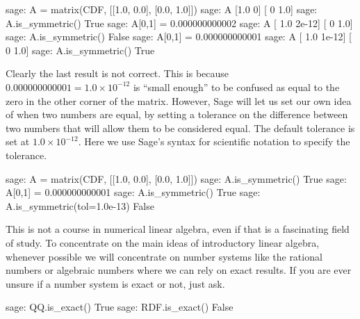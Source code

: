 %
\begin{sageexample}
sage: A = matrix(CDF, [[1.0, 0.0], [0.0, 1.0]])
sage: A
[1.0   0]
[  0 1.0]
sage: A.is_symmetric()
True
sage: A[0,1] = 0.000000000002
sage: A
[  1.0 2e-12]
[    0   1.0]
sage: A.is_symmetric()
False
sage: A[0,1] = 0.000000000001
sage: A
[  1.0 1e-12]
[    0   1.0]
sage: A.is_symmetric()
True
\end{sageexample}
%
Clearly the last result is not correct.  This is because $0.000000000001 = 1.0\times 10^{-12}$ is ``small enough'' to be confused as equal to the zero in the other corner of the matrix.  However, Sage will let us set our own idea of when two numbers are equal, by setting a tolerance on the difference between two numbers that will allow them to be considered equal.  The default tolerance is set at $1.0\times 10^{-12}$.  Here we use Sage's syntax for scientific notation to specify the tolerance.
%
\begin{sageexample}
sage: A = matrix(CDF, [[1.0, 0.0], [0.0, 1.0]])
sage: A.is_symmetric()
True
sage: A[0,1] = 0.000000000001
sage: A.is_symmetric()
True
sage: A.is_symmetric(tol=1.0e-13)
False
\end{sageexample}
%
This is not a course in numerical linear algebra, even if that is a fascinating field of study.  To concentrate on the main ideas of introductory linear algebra, whenever possible we will concentrate on number systems like the rational numbers or algebraic numbers where we can rely on exact results.  If you are ever unsure if a number system is exact or not, just ask.
%
\begin{sageexample}
sage: QQ.is_exact()
True
sage: RDF.is_exact()
False
\end{sageexample}
%
\begin{sageverbatim}
\end{sageverbatim}
%

